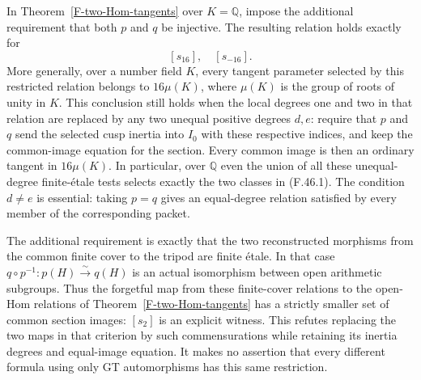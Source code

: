 \begin{proposition}
\label{F-finite-etale-tangents}
In Theorem~\ref{F-two-Hom-tangents} over $K=\mathbb Q$,
impose the additional requirement that both $p$ and $q$ be
injective. The resulting relation holds exactly for
\[
                         [s_{16}],\quad [s_{-16}].
 \tag{F.46.1}
\]
More generally, over a number field $K$, every tangent parameter
selected by this restricted relation belongs to $16\mu(K)$,
where $\mu(K)$ is the group of roots of unity in $K$.
This conclusion still holds when the local degrees one and two
in that relation are replaced by any two unequal positive
degrees $d,e$: require that $p$ and $q$ send the selected cusp
inertia into $I_0$ with these respective indices, and keep the
common-image equation for the section. Every common image is
then an ordinary tangent in $16\mu(K)$. In particular, over
$\mathbb Q$ even the union of all these unequal-degree
finite-\'etale tests selects exactly the two classes in
(F.46.1). The condition $d\ne e$ is essential: taking $p=q$
gives an equal-degree relation satisfied by every member of
the corresponding packet.

The additional requirement is exactly that the two reconstructed
morphisms from the common finite cover to the tripod are finite
\'etale. In that case $q\circ p^{-1}:p(H)\xrightarrow{\sim}q(H)$
is an actual isomorphism between open arithmetic subgroups.
Thus the forgetful map from these finite-cover relations to the
open-Hom relations of Theorem~\ref{F-two-Hom-tangents} has a
strictly smaller set of common section images: $[s_2]$ is an
explicit witness. This refutes replacing the two maps in that
criterion by such commensurations while retaining its inertia
degrees and equal-image equation. It makes no assertion that
every different formula using only GT automorphisms has this
same restriction.
\end{proposition}

